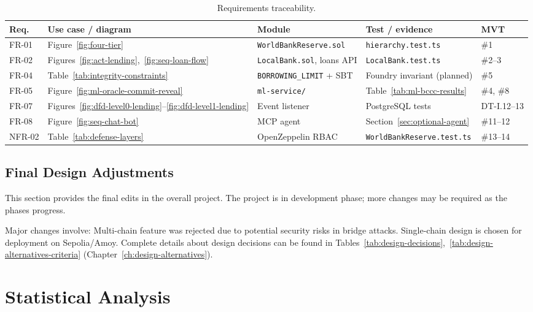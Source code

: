 \documentclass[12pt,a4paper]{report}
\newcommand{\tableheadcolor}{\rowcolor{TableHeadBg}}
\begin{document}
\begin{table}[H]
\centering
\caption[Requirements traceability]{Requirements traceability.}
\label{tab:traceability}
\footnotesize
\begin{tabular}{@{}p{1.1cm}p{2.6cm}p{2.8cm}p{2.6cm}p{3.2cm}@{}}
\toprule
\tableheadcolor
\textbf{Req.} & \textbf{Use case / diagram} & \textbf{Module} & \textbf{Test / evidence} & \textbf{MVT} \\
\midrule
FR-01 & Figure~\ref{fig:four-tier} & \texttt{WorldBankReserve.sol} & \texttt{hierarchy.test.ts} & \#1 \\
FR-02 & Figures~\ref{fig:act-lending},~\ref{fig:seq-loan-flow} & \texttt{LocalBank.sol}, loans API & \texttt{LocalBank.test.ts} & \#2--3 \\
FR-04 & Table~\ref{tab:integrity-constraints} & \texttt{BORROWING\_LIMIT} + SBT & Foundry invariant (planned) & \#5 \\
FR-05 & Figure~\ref{fig:ml-oracle-commit-reveal} & \texttt{ml-service/} & Table~\ref{tab:ml-bccc-results} & \#4, \#8 \\
FR-07 & Figures~\ref{fig:dfd-level0-lending}--\ref{fig:dfd-level1-lending} & Event listener & PostgreSQL tests & DT-I.12--13 \\
FR-08 & Figure~\ref{fig:seq-chat-bot} & MCP agent & Section~\ref{sec:optional-agent} & \#11--12 \\
NFR-02 & Table~\ref{tab:defense-layers} & OpenZeppelin RBAC & \texttt{WorldBankReserve.test.ts} & \#13--14 \\
\bottomrule
\end{tabular}
\end{table}

\subsection{Final Design Adjustments}
\label{sec:final-design-adjustments}
\label{sec:bridge}

This section provides the final edits in the overall project. The project is in development phase; more changes may be required as the phases progress.

Major changes involve: Multi-chain feature was rejected due to potential security risks in bridge attacks. Single-chain design is chosen for deployment on Sepolia/Amoy. Complete details about design decisions can be found in Tables~\ref{tab:design-decisions},~\ref{tab:design-alternatives-criteria} (Chapter~\ref{ch:design-alternatives}).

\section{Statistical Analysis}
\label{sec:statistical-analysis}
\end{document}
